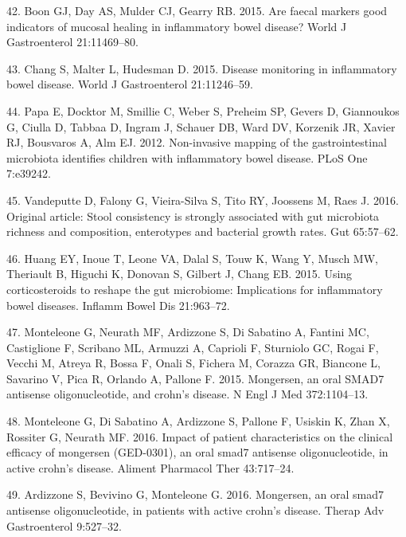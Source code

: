 \documentclass[11pt,]{article}
\begin{document}
\hypertarget{ref-boon_fmarkers_2015}{}
42. Boon GJ, Day AS, Mulder CJ, Gearry RB. 2015. Are faecal markers good
indicators of mucosal healing in inflammatory bowel disease? World J
Gastroenterol 21:11469--80.

\hypertarget{ref-chang_monitoring_2015}{}
43. Chang S, Malter L, Hudesman D. 2015. Disease monitoring in
inflammatory bowel disease. World J Gastroenterol 21:11246--59.

\hypertarget{ref-papa_pedsIBD_2012}{}
44. Papa E, Docktor M, Smillie C, Weber S, Preheim SP, Gevers D,
Giannoukos G, Ciulla D, Tabbaa D, Ingram J, Schauer DB, Ward DV,
Korzenik JR, Xavier RJ, Bousvaros A, Alm EJ. 2012. Non-invasive mapping
of the gastrointestinal microbiota identifies children with inflammatory
bowel disease. PLoS One 7:e39242.

\hypertarget{ref-vandeputte_stoolcon_2016}{}
45. Vandeputte D, Falony G, Vieira-Silva S, Tito RY, Joossens M, Raes J.
2016. Original article: Stool consistency is strongly associated with
gut microbiota richness and composition, enterotypes and bacterial
growth rates. Gut 65:57--62.

\hypertarget{ref-huang_cort_2015}{}
46. Huang EY, Inoue T, Leone VA, Dalal S, Touw K, Wang Y, Musch MW,
Theriault B, Higuchi K, Donovan S, Gilbert J, Chang EB. 2015. Using
corticosteroids to reshape the gut microbiome: Implications for
inflammatory bowel diseases. Inflamm Bowel Dis 21:963--72.

\hypertarget{ref-monteleone_mongersen_2015}{}
47. Monteleone G, Neurath MF, Ardizzone S, Di Sabatino A, Fantini MC,
Castiglione F, Scribano ML, Armuzzi A, Caprioli F, Sturniolo GC, Rogai
F, Vecchi M, Atreya R, Bossa F, Onali S, Fichera M, Corazza GR, Biancone
L, Savarino V, Pica R, Orlando A, Pallone F. 2015. Mongersen, an oral
SMAD7 antisense oligonucleotide, and crohn's disease. N Engl J Med
372:1104--13.

\hypertarget{ref-monteleone_mongersen_2016}{}
48. Monteleone G, Di Sabatino A, Ardizzone S, Pallone F, Usiskin K, Zhan
X, Rossiter G, Neurath MF. 2016. Impact of patient characteristics on
the clinical efficacy of mongersen (GED-0301), an oral smad7 antisense
oligonucleotide, in active crohn's disease. Aliment Pharmacol Ther
43:717--24.

\hypertarget{ref-ardizzone_mongersen_2016}{}
49. Ardizzone S, Bevivino G, Monteleone G. 2016. Mongersen, an oral
smad7 antisense oligonucleotide, in patients with active crohn's
disease. Therap Adv Gastroenterol 9:527--32.
\end{document}
